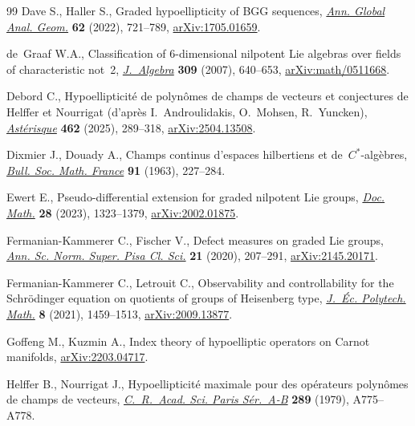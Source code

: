 \documentclass[pdftex]{sigma}
\numberwithin{equation}{section}
\theoremstyle{definition}
\begin{document}
\begin{thebibliography}{99}
Dave S., Haller S., Graded hypoellipticity of {BGG} sequences,
 \href{https://doi.org/10.1007/s10455-022-09870-0}{\textit{Ann. Global Anal.
 Geom.}} \textbf{62} (2022), 721--789,
 \href{https://arxiv.org/abs/1705.01659}{arXiv:1705.01659}.

de~Graaf W.A., Classification of 6-dimensional nilpotent {L}ie algebras over
 fields of characteristic not~2,
 \href{https://doi.org/10.1016/j.jalgebra.2006.08.006}{\textit{J.~Algebra}}
 \textbf{309} (2007), 640--653,
 \href{https://arxiv.org/abs/math/0511668}{arXiv:math/0511668}.

Debord C., Hypoellipticit\'e de polyn\^omes de champs de vecteurs et
 conjectures de {H}elffer et {N}ourrigat (d'apr\`es {I}.~{A}ndroulidakis, {O}.~{M}ohsen, {R}.~{Y}uncken), \href{https://doi.org/10.24033/ast.1261}{\textit{Ast\'erisque}} \textbf{462} (2025), 289--318,
 \href{https://arxiv.org/abs/2504.13508}{arXiv:2504.13508}.

Dixmier J., Douady A., Champs continus d'espaces hilbertiens et de~{$C^{\ast}
 $}-alg\`ebres, \href{https://doi.org/10.24033/bsmf.1596}{\textit{Bull. Soc.
 Math. France}} \textbf{91} (1963), 227--284.

Ewert E., Pseudo-differential extension for graded nilpotent {L}ie groups,
 \href{https://doi.org/10.4171/dm/940}{\textit{Doc. Math.}} \textbf{28}
 (2023), 1323--1379,
 \href{https://arxiv.org/abs/2002.01875}{arXiv:2002.01875}.

Fermanian-Kammerer C., Fischer V., Defect measures on graded {L}ie groups,
 \href{https://doi.org/10.2422/2036-2145.201711_011}{\textit{Ann. Sc. Norm.
 Super. Pisa Cl. Sci.}} \textbf{21} (2020), 207--291,
 \href{https://arxiv.org/abs/2145.20171}{arXiv:2145.20171}.

Fermanian-Kammerer C., Letrouit C., Observability and controllability for the
 {S}chr\"odinger equation on quotients of groups of {H}eisenberg type,
 \href{https://doi.org/10.5802/jep.176}{\textit{J.~\'Ec. Polytech. Math.}}
 \textbf{8} (2021), 1459--1513,
 \href{https://arxiv.org/abs/2009.13877}{arXiv:2009.13877}.

Goffeng M., Kuzmin A., Index theory of hypoelliptic operators on {C}arnot
 manifolds, \href{https://arxiv.org/abs/2203.04717}{arXiv:2203.04717}.

Helffer B., Nourrigat J., Hypoellipticit\'e maximale pour des op\'erateurs
 polyn\^omes de champs de vecteurs,
 \href{https://doi.org/10.5802/jedp.206}{\textit{C.~R.~Acad. Sci. Paris
 S\'er.~A-B}} \textbf{289} (1979), A775--A778.


\end{thebibliography}
\end{document}
